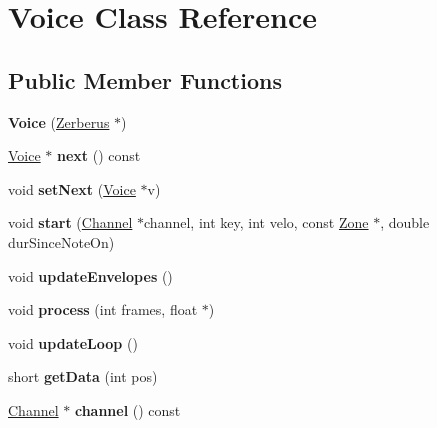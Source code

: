 \hypertarget{class_voice}{}\section{Voice Class Reference}
\label{class_voice}
\subsection*{Public Member Functions}
\begin{DoxyCompactItemize}
\item 
\mbox{\label{class_voice_a8b73ff1c36d8506309f0938747660a9f}} 
{\bfseries Voice} (\hyperlink{class_zerberus}{Zerberus} $\ast$)
\item 
\mbox{\label{class_voice_a8de72e95d2ed9dbe8c9664cc27179598}} 
\hyperlink{class_voice}{Voice} $\ast$ {\bfseries next} () const
\item 
\mbox{\label{class_voice_a5ade763debd1a7334a5b4a17063bff50}} 
void {\bfseries set\+Next} (\hyperlink{class_voice}{Voice} $\ast$v)
\item 
\mbox{\label{class_voice_a686c811129693c23c595b97501a4c06d}} 
void {\bfseries start} (\hyperlink{class_channel}{Channel} $\ast$channel, int key, int velo, const \hyperlink{struct_zone}{Zone} $\ast$, double dur\+Since\+Note\+On)
\item 
\mbox{\label{class_voice_a7ba39ec631b36af0f92fa126a60fd6ee}} 
void {\bfseries update\+Envelopes} ()
\item 
\mbox{\label{class_voice_ae8f13e42d4dc6db39ef4c5180f05091c}} 
void {\bfseries process} (int frames, float $\ast$)
\item 
\mbox{\label{class_voice_a6f62bb3645913ab978365dbd149512b4}} 
void {\bfseries update\+Loop} ()
\item 
\mbox{\label{class_voice_a2944cfd9cb88431e09377046d7663a6c}} 
short {\bfseries get\+Data} (int pos)
\item 
\mbox{\label{class_voice_a930f18a2835ebe9e0802ef614f3f6714}} 
\hyperlink{class_channel}{Channel} $\ast$ {\bfseries channel} () const

\end{DoxyCompactItemize}

